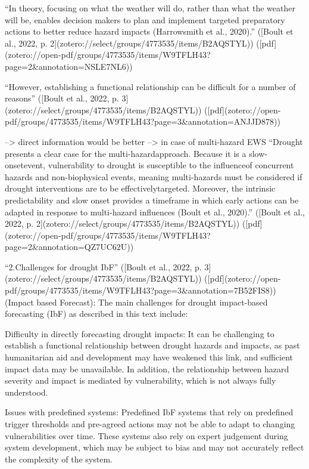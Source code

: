 “In theory, focusing on what the weather will do, rather than what the weather will be, enables decision makers to plan and implement targeted preparatory actions to better reduce hazard impacts (Harrowsmith et al., 2020).” ([Boult et al., 2022, p. 2](zotero://select/groups/4773535/items/B2AQSTYL)) ([pdf](zotero://open-pdf/groups/4773535/items/W9TFLH43?page=2&annotation=NSLE7NL6))

“However, establishing a functional relationship can be difficult for a number of reasons” ([Boult et al., 2022, p. 3](zotero://select/groups/4773535/items/B2AQSTYL)) ([pdf](zotero://open-pdf/groups/4773535/items/W9TFLH43?page=3&annotation=ANJJD878))

--> direct information would be better
--> in case of multi-hazard EWS
“Drought presents a clear case for the multi-hazardapproach. Because it is a slow-onsetevent, vulnerability to drought is susceptible to the influenceof concurrent hazards and non-biophysical events, meaning multi-hazards must be considered if drought interventions are to be effectivelytargeted. Moreover, the intrinsic predictability and slow onset provides a timeframe in which early actions can be adapted in response to multi-hazard influences (Boult et al., 2020).” ([Boult et al., 2022, p. 2](zotero://select/groups/4773535/items/B2AQSTYL)) ([pdf](zotero://open-pdf/groups/4773535/items/W9TFLH43?page=2&annotation=QZ7UC62U))

“2.Challenges for drought IbF” ([Boult et al., 2022, p. 3](zotero://select/groups/4773535/items/B2AQSTYL)) ([pdf](zotero://open-pdf/groups/4773535/items/W9TFLH43?page=3&annotation=7B52FIS8)) (Impact based Forecast):
The main challenges for drought impact-based forecasting (IbF) as described in this text include:

Difficulty in directly forecasting drought impacts: It can be challenging to establish a functional relationship between drought hazards and impacts, as past humanitarian aid and development may have weakened this link, and sufficient impact data may be unavailable. In addition, the relationship between hazard severity and impact is mediated by vulnerability, which is not always fully understood.

Issues with predefined systems: Predefined IbF systems that rely on predefined trigger thresholds and pre-agreed actions may not be able to adapt to changing vulnerabilities over time. These systems also rely on expert judgement during system development, which may be subject to bias and may not accurately reflect the complexity of the system.

